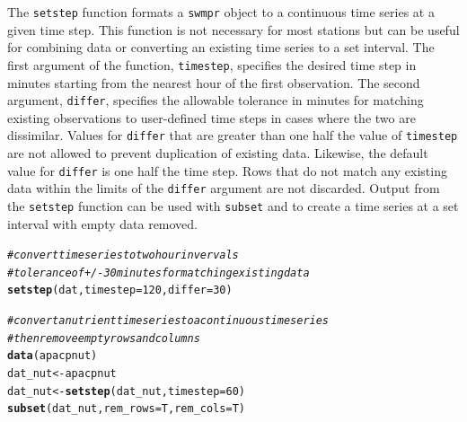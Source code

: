 \documentclass[10pt,letterpaper]{article}\usepackage[]{graphicx}\usepackage[]{color}
\makeatletter
\newcommand{\hlnum}[1]{\textcolor[rgb]{0.686,0.059,0.569}{#1}}%
\newcommand{\hlcom}[1]{\textcolor[rgb]{0.678,0.584,0.686}{\textit{#1}}}%
\newcommand{\hlstd}[1]{\textcolor[rgb]{0.345,0.345,0.345}{#1}}%
\newcommand{\hlkwb}[1]{\textcolor[rgb]{0.69,0.353,0.396}{#1}}%
\newcommand{\hlkwc}[1]{\textcolor[rgb]{0.333,0.667,0.333}{#1}}%
\newcommand{\hlkwd}[1]{\textcolor[rgb]{0.737,0.353,0.396}{\textbf{#1}}}%
\newenvironment{kframe}{%
 \def\at@end@of@kframe{}%
 \ifinner\ifhmode%
  \def\at@end@of@kframe{\end{minipage}}%
  \begin{minipage}{\columnwidth}%
 \fi\fi%
 \def\FrameCommand##1{\hskip\@totalleftmargin \hskip-\fboxsep
 \colorbox{shadecolor}{##1}\hskip-\fboxsep
     \hskip-\linewidth \hskip-\@totalleftmargin \hskip\columnwidth}%
 \MakeFramed {\advance\hsize-\width
   \@totalleftmargin\z@ \linewidth\hsize
   \@setminipage}}%
 {\par\unskip\endMakeFramed%
 \at@end@of@kframe}
\newenvironment{knitrout}{}{} %
\makeatother
\begin{document}
The \texttt{setstep} function formats a \texttt{swmpr} object to a continuous time series at a given time step.  This function is not necessary for most stations but can be useful for combining data or converting an existing time series to a set interval.  The first argument of the function, \texttt{timestep}, specifies the desired time step in minutes starting from the nearest hour of the first observation.  The second argument, \texttt{differ}, specifies the allowable tolerance in minutes for matching existing observations to user-defined time steps in cases where the two are dissimilar.  Values for \texttt{differ} that are greater than one half the value of \texttt{timestep} are not allowed to prevent duplication of existing data.  Likewise, the default value for \texttt{differ} is one half the time step.  Rows that do not match any existing data within the limits of the \texttt{differ} argument are not discarded.  Output from the \texttt{setstep} function can be used with \texttt{subset} and to create a time series at a set interval with empty data removed.

\begin{knitrout}
\color{fgcolor}\begin{kframe}
\begin{alltt}
\hlcom{# convert time series to two hour invervals}
\hlcom{# tolerance of +/- 30 minutes for matching existing data}
\hlkwd{setstep}\hlstd{(dat,} \hlkwc{timestep} \hlstd{=} \hlnum{120}\hlstd{,} \hlkwc{differ} \hlstd{=} \hlnum{30}\hlstd{)}

\hlcom{# convert a nutrient time series to a continuous time series}
\hlcom{# then remove empty rows and columns}
\hlkwd{data}\hlstd{(apacpnut)}
\hlstd{dat_nut} \hlkwb{<-} \hlstd{apacpnut}
\hlstd{dat_nut} \hlkwb{<-} \hlkwd{setstep}\hlstd{(dat_nut,} \hlkwc{timestep} \hlstd{=} \hlnum{60}\hlstd{)}
\hlkwd{subset}\hlstd{(dat_nut,} \hlkwc{rem_rows} \hlstd{= T,} \hlkwc{rem_cols} \hlstd{= T)}
\end{alltt}
\end{kframe}
\end{knitrout}
\end{document}

